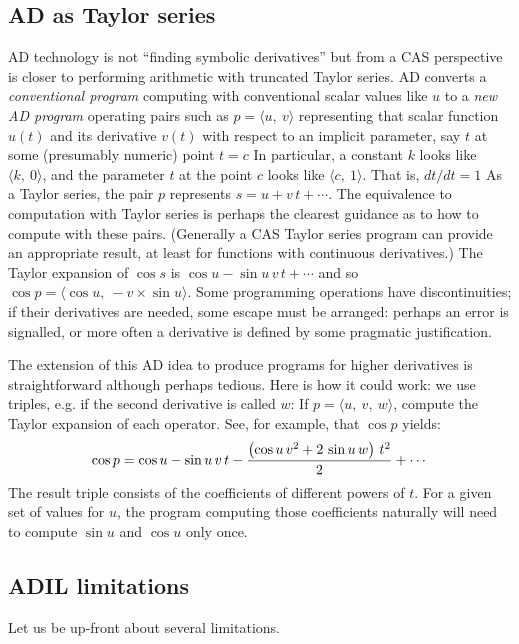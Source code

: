 \documentclass{article}
\begin{document}
\subsection{AD as Taylor series}

AD technology is not ``finding symbolic derivatives'' but from a CAS
perspective is closer to performing arithmetic  
with truncated Taylor series.  AD converts
a {\em conventional program} computing with conventional scalar values
like $u$ to a {\em new AD program} operating pairs such as $p=\langle
u,~v\rangle$ representing that scalar function $u(t)$ and its
derivative $v(t)$ with respect to an implicit parameter, say $t$ at
some (presumably numeric) point $t=c$ In particular, a constant $k$
looks like $\langle k,~0\rangle$, and the parameter $t$ at the point
$c$ looks like $\langle c ,~1\rangle$. That is, $dt/dt=1$ As a Taylor
series, the pair $p$ represents $ s=u+v\,t+\cdots $.  The equivalence
to computation with Taylor series is perhaps the clearest guidance as
to how to compute with these pairs.  (Generally a CAS Taylor series
program can provide an appropriate result, at least for functions with
continuous derivatives.)  The Taylor expansion of $\cos s$ is $ \cos
u-\sin u\,v\,t+\cdots $ and so $\cos p=\langle \cos u,~-v \times \sin
u\rangle$. Some programming operations have discontinuities; if their
derivatives are needed, some escape must be arranged: perhaps an error
is signalled, or more often a derivative is defined by some pragmatic
justification.

The extension of this AD idea to produce programs for higher
derivatives is straightforward although perhaps tedious. Here is how it could
work: we use triples, e.g. if the second derivative is called $w$: If
$p=\langle u,~v,~w \rangle$, compute the Taylor expansion of each
operator. See, for example, that $\cos p$ yields:
$$ \cos p = \cos u-\sin u\,v\,t-{{\left(\cos u\,v^{2}+2\,\sin
u\,w\right)\,t^{ 2}}\over{2}}+\cdots $$ The result triple consists of
the coefficients of different powers of $t$.  For a given set of
values for $u$, the program computing those coefficients naturally
will need to compute $\sin u$ and $\cos u$ only once.

\subsection{ADIL limitations}
Let us be up-front about several limitations. 
\end{document}
